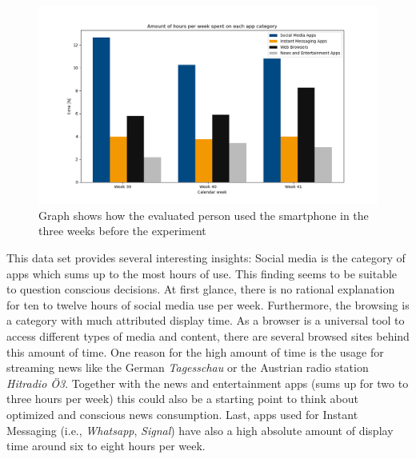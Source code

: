\documentclass[11pt,a4paper]{article}
\begin{document}
\begin{figure}[H]
\centering
\includegraphics[width = \textwidth]{../data/usage-times.png}
\caption{Graph shows how the evaluated person used the smartphone in the three weeks before the experiment}
\end{figure}

This data set provides several interesting insights: Social media is the category of apps which sums up to the most hours of use. This finding seems to be suitable to question conscious decisions. At first glance, there is no rational explanation for ten to twelve hours of social media use per week. Furthermore, the browsing is a category with much attributed display time. As a browser is a universal tool to access different types of media and content, there are several browsed sites behind this amount of time. One reason for the high amount of time is the usage for streaming news like the German \textit{Tagesschau} or the Austrian radio station \textit{Hitradio Ö3}. Together with the news and entertainment apps (sums up for two to three hours per week) this could also be a starting point to think about optimized and conscious news consumption. Last, apps used for Instant Messaging (i.e., \textit{Whatsapp}, \textit{Signal}) have also a high absolute amount of display time around six to eight hours per week.
\end{document}
